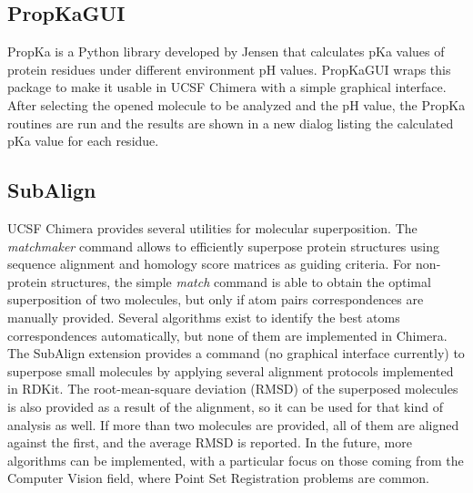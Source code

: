 \subsection{PropKaGUI}
PropKa is a Python library developed by Jensen\cite{propka}  that calculates pKa values of protein residues under different environment pH values. PropKaGUI wraps this package to make it usable in UCSF Chimera with a simple graphical interface. After selecting the opened molecule to be analyzed and the pH value, the PropKa routines are run and the results are shown in a new dialog listing the calculated pKa value for each residue. 

\subsection{SubAlign}
UCSF Chimera provides several utilities for molecular superposition. The \textit{matchmaker} command allows to efficiently superpose protein structures using sequence alignment and homology score matrices as guiding criteria. For non-protein structures, the simple \textit{match} command is able to obtain the optimal superposition of two molecules, but only if atom pairs correspondences are manually provided. Several algorithms exist to identify the best atoms correspondences automatically,\cite{cho2006flame,girones2001tgsa} but none of them are implemented in Chimera. The SubAlign extension provides a command (no graphical interface currently) to superpose small molecules by applying several alignment protocols implemented in RDKit.\cite{rdkit} The root-mean-square deviation (RMSD) of the superposed molecules is also provided as a result of the alignment, so it can be used for that kind of analysis as well. If more than two molecules are provided, all of them are aligned against the first, and the average RMSD is reported. In the future, more algorithms can be implemented, with a particular focus on those coming from the Computer Vision field, where Point Set Registration problems are common.
